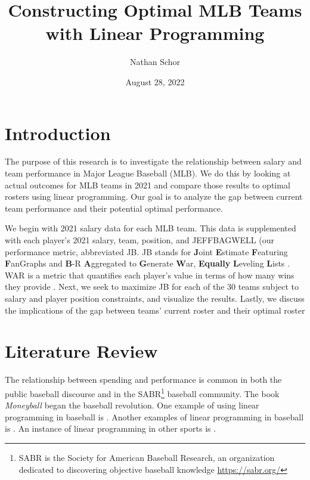 \documentclass{article}
\title{Constructing Optimal MLB Teams with Linear Programming}
\author{Nathan Schor}
\date{August 28, 2022}
\begin{document}
\maketitle
\begin{singlespace}
\tableofcontents
\end{singlespace}

\newpage

\section{Introduction}

The purpose of this research is to investigate the relationship between salary and team performance in Major League Baseball (MLB). We do this by looking at actual outcomes for MLB teams in 2021 and compare those results to optimal rosters using linear programming. Our goal is to analyze the gap between current team performance and their potential optimal performance. 

We begin with 2021 salary data for each MLB team. This data is supplemented with each player's 2021 salary, team, position, and JEFFBAGWELL (our performance metric, abbreviated JB. JB stands for \textbf{J}oint \textbf{E}stimate \textbf{F}eaturing \textbf{F}anGraphs and \textbf{B}-R \textbf{A}ggregated to \textbf{G}enerate \textbf{W}ar, \textbf{Equally} \textbf{L}eveling \textbf{L}ists \cite{JB}. WAR is a metric that quantifies each player's value in terms of how many wins they provide \cite{WAR}. Next, we seek to maximize JB for each of the 30 teams subject to salary and player position constraints, and visualize the results. Lastly, we discuss the implications of the gap between teams' current roster and their optimal roster

\section{Literature Review}

The relationship between spending and performance is common in both the public baseball discourse and in the SABR\footnote{SABR is the Society for American Baseball Research, an organization dedicated to discovering objective baseball knowledge \url{https://sabr.org/}} baseball community. The book \emph{Moneyball} \cite{Moneyball} began the baseball revolution. One example of using linear programming in baseball is \cite{lp_R}. Another examples of linear programming in baseball is \cite{Adler99baseball}. An instance of linear programming in other sports is \cite{Aramouni2021}.
\end{document}
